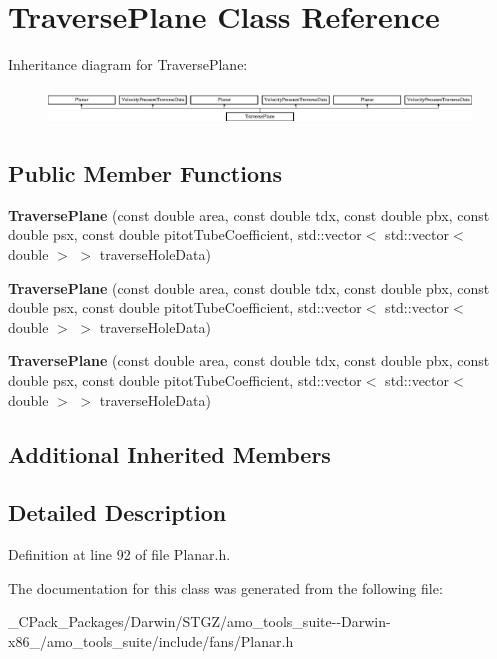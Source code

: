 \hypertarget{class_traverse_plane}{}\section{Traverse\+Plane Class Reference}
\label{class_traverse_plane}
Inheritance diagram for Traverse\+Plane\+:\begin{figure}[H]
\begin{center}
\leavevmode
\includegraphics[height=0.962199cm]{dc/d2a/class_traverse_plane}
\end{center}
\end{figure}
\subsection*{Public Member Functions}
\begin{DoxyCompactItemize}
\item 
\mbox{\label{class_traverse_plane_abbe5d384cc7fbd35c19c4f840247769f}} 
{\bfseries Traverse\+Plane} (const double area, const double tdx, const double pbx, const double psx, const double pitot\+Tube\+Coefficient, std\+::vector$<$ std\+::vector$<$ double $>$ $>$ traverse\+Hole\+Data)
\item 
\mbox{\label{class_traverse_plane_abbe5d384cc7fbd35c19c4f840247769f}} 
{\bfseries Traverse\+Plane} (const double area, const double tdx, const double pbx, const double psx, const double pitot\+Tube\+Coefficient, std\+::vector$<$ std\+::vector$<$ double $>$ $>$ traverse\+Hole\+Data)
\item 
\mbox{\label{class_traverse_plane_abbe5d384cc7fbd35c19c4f840247769f}} 
{\bfseries Traverse\+Plane} (const double area, const double tdx, const double pbx, const double psx, const double pitot\+Tube\+Coefficient, std\+::vector$<$ std\+::vector$<$ double $>$ $>$ traverse\+Hole\+Data)
\end{DoxyCompactItemize}
\subsection*{Additional Inherited Members}


\subsection{Detailed Description}


Definition at line 92 of file Planar.\+h.



The documentation for this class was generated from the following file\+:\begin{DoxyCompactItemize}
\item 
\+\_\+\+C\+Pack\+\_\+\+Packages/\+Darwin/\+S\+T\+G\+Z/amo\+\_\+tools\+\_\+suite-\/-\/\+Darwin-\/x86\+\_/amo\+\_\+tools\+\_\+suite/include/fans/Planar.\+h\end{DoxyCompactItemize}
